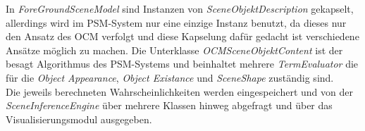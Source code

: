 In \textit{ForeGroundSceneModel} sind Instanzen von \textit{SceneObjektDescription} gekapselt, allerdings wird im PSM-System nur eine einzige Instanz benutzt, da dieses nur den Ansatz des OCM verfolgt und diese Kapselung dafür gedacht ist verschiedene Ansätze möglich zu machen. Die Unterklasse \textit{OCMSceneObjektContent} ist der besagt Algorithmus des PSM-Systems und beinhaltet mehrere \textit{TermEvaluator} die für die \textit{Object Appearance}, \textit{Object Existance} und \textit{SceneShape} zuständig sind.\smallskip\\
Die jeweils berechneten Wahrscheinlichkeiten werden eingespeichert und von der \textit{SceneInferenceEngine} über mehrere Klassen hinweg abgefragt und über das Visualisierungsmodul ausgegeben.
\begin{deprecated}
\cite{gehrung14}
\end{deprecated}



